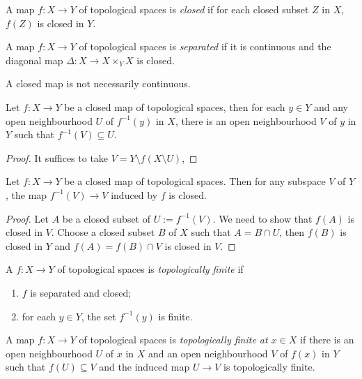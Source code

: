 \begin{definition}
    A map $f:X\rightarrow Y$ of topological spaces is \emph{closed} if for each closed subset $Z$ in $X$, $f(Z)$ is closed in $Y$.

    A map $f:X\rightarrow Y$ of topological spaces is \emph{separated} if it is continuous and the diagonal map $\Delta:X\rightarrow X\times_Y X$ is closed.
\end{definition}
A closed map is not necessarily continuous.

\begin{lemma}\label{lma-opennhfiberclosedmap}
    Let $f:X\rightarrow Y$ be a closed map of topological spaces, then for each $y\in Y$ and any open neighbourhood $U$ of $f^{-1}(y)$ in $X$, there is an open neighbourhood $V$ of $y$ in $Y$ such that $f^{-1}(V)\subseteq U$.
\end{lemma}
\begin{proof}
    It suffices to take $V=Y\setminus f(X\setminus U)$,
\end{proof}
\begin{lemma}\label{lma-closedmaprestricttarget}
    Let $f:X\rightarrow Y$ be a closed map of topological spaces. Then for any subspace $V$ of $Y$, the map $f^{-1}(V)\rightarrow V$ induced by $f$ is closed.
\end{lemma}
\begin{proof}
    Let $A$ be a closed subset of $U:=f^{-1}(V)$. We need to show that $f(A)$ is closed in $V$. Choose a closed subset $B$ of $X$ such that $A=B\cap U$, then $f(B)$ is closed in $Y$ and $f(A)=f(B)\cap V$ is closed in $V$.
\end{proof}

\begin{definition}
    A $f:X\rightarrow Y$ of topological spaces is \emph{topologically finite} if 
    \begin{enumerate}
        \item $f$ is separated and closed;
        \item for each $y\in Y$, the set $f^{-1}(y)$ is finite.
    \end{enumerate}

    A map $f:X\rightarrow Y$ of topological spaces is \emph{topologically finite at $x\in X$} if there is an open neighbourhood $U$ of $x$ in $X$ and an open neighbourhood $V$ of $f(x)$ in $Y$ such that $f(U)\subseteq V$ and the induced map $U\rightarrow V$ is topologically finite.
\end{definition}

